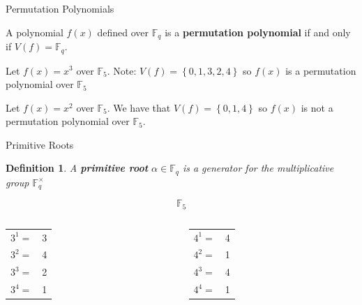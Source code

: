 \documentclass{beamer}
\newtheorem*{definition*}{Definition}
\begin{document}
\begin{frame}{Permutation Polynomials}

\begin{definition}
  A polynomial $f(x)$ defined over $\mathbb{F}_{q}$ is a \textbf{permutation polynomial} if and only if  $V(f) = \mathbb{F}_{q}$.
\end{definition}

\pause

\begin{example}
  Let $f(x) = x^3$ over $\mathbb{F}_{5}$. Note: $V(f) = \left\{0, 1, 3, 2, 4 \right\}$ so $f(x)$ is a permutation polynomial over $\mathbb{F}_{5}$
\end{example}

\pause

\begin{example}
Let $f(x) = x^2$ over $\mathbb{F}_{5}$. We have that $V(f) = \left\{0, 1, 4 \right\}$ so $f(x)$ is not a permutation polynomial over $\mathbb{F}_{5}$.
\end{example}

\end{frame}


\begin{frame}{Primitive Roots}

\begin{definition*}
  A \textbf{primitive root} $\alpha \in \mathbb{F}_q$ is a generator for the multiplicative group $\mathbb{F}_{q}^{\times}$
\end{definition*}

\pause
  
{\Large $$\mathbb{F}_{5}$$}
\pause
\begin{columns}[t] %
{\Large \begin{tabular}{ l  r }
  $3^1=$ & 3 \\
  $3^2=$ & 4 \\
  $3^3=$ & 2 \\
  $3^4=$ & 1 \\
\end{tabular}}
\pause
{}
{\Large \begin{tabular}{ l  r }
  $4^1=$ & 4 \\
  $4^2=$ & 1 \\
  $4^3=$ & 4 \\
  $4^4=$ & 1 \\
\end{tabular}}
\end{columns}

\end{frame}
\end{document}
